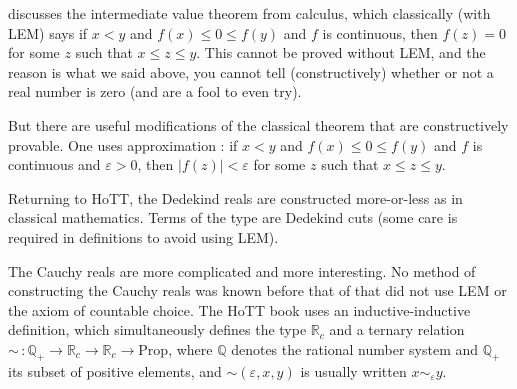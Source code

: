 \documentclass[11pt]{article}
\newcommand{\real}{\mathbb{R}}
\newcommand{\rats}{\mathbb{Q}}
\begin{document}
\citet[Section~5.1]{bauer-constructive} discusses the intermediate value
theorem from calculus, which classically (with LEM) says if $x < y$
and $f(x) \le 0 \le f(y)$ and $f$ is continuous, then $f(z) = 0$ for
some $z$ such that $x \le z \le y$.
This cannot be proved without LEM, and the reason is what we said above,
you cannot tell (constructively) whether or not a real number is zero
(and are a fool to even try).

But there are useful modifications of the classical theorem that
are constructively provable.  One uses approximation
\citep[Theorem~5.4]{bauer-constructive}: if $x < y$ and $f(x) \le 0 \le f(y)$
and $f$ is continuous and $\varepsilon > 0$,
then  $\lvert f(z) \rvert < \varepsilon$ for some $z$ such that $x \le z \le y$.

Returning to HoTT, the Dedekind reals are constructed more-or-less as in
classical mathematics.  Terms of the type are Dedekind cuts
(some care is required in definitions to avoid using LEM).

The Cauchy reals are more complicated and more interesting.
No method of constructing the Cauchy reals was known before that of
 that did not use LEM or the axiom
of countable choice.  The HoTT book uses an inductive-inductive definition,
which simultaneously defines the type $\real_c$ and a ternary relation
$\sim\, : \rats_+ \to \real_c \to \real_c \to \text{Prop}$,
where $\rats$ denotes
the rational number system 
and $\rats_+$ its subset of positive elements,
and $\sim(\varepsilon, x, y)$ is usually written $x \sim_\varepsilon y$.
\end{document}
